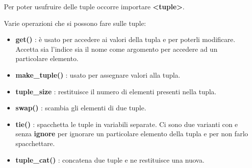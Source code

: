 \textsf{\small Per poter usufruire delle tuple occorre importare \textbf{<tuple>}.} \break

\textsf{\small Varie operazioni che si possono fare sulle tuple: } \\

\begin{itemize}
	\item \textsf{\small \textbf{get()} : è usato per accedere ai valori della tupla e per poterli modificare. Accetta sia l'indice sia il nome come argomento per accedere ad un particolare elemento.}
	\item \textsf{\small \textbf{make\_tuple()} : usato per assegnare valori alla tupla.}
	\item \textsf{\small \textbf{tuple\_size} : restituisce il numero di elementi presenti nella tupla.}
	\item \textsf{\small \textbf{swap()} : scambia gli elementi di due tuple.}
	\item \textsf{\small \textbf{tie()} : spacchetta le tuple in variabili separate. Ci sono due varianti con e senza \textbf{ignore} per ignorare un particolare elemento della tupla e per non farlo spacchettare.}
	\item \textsf{\small \textbf{tuple\_cat()} : concatena due tuple e ne restituisce una nuova.}
\end{itemize}

